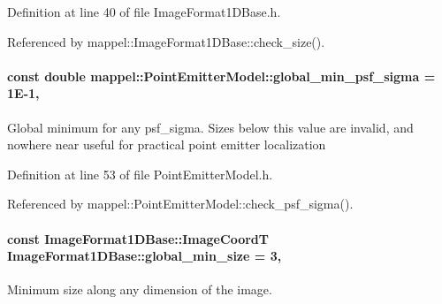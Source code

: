Definition at line 40 of file Image\+Format1\+D\+Base.\+h.



Referenced by mappel\+::\+Image\+Format1\+D\+Base\+::check\+\_\+size().

\paragraph[{\texorpdfstring{global\+\_\+min\+\_\+psf\+\_\+sigma}{global_min_psf_sigma}}]{\setlength{\rightskip}{0pt plus 5cm}const double mappel\+::\+Point\+Emitter\+Model\+::global\+\_\+min\+\_\+psf\+\_\+sigma = 1\+E-\/1\hspace{0.3cm}{\ttfamily [static]}, {\ttfamily [inherited]}}\hypertarget{classmappel_1_1PointEmitterModel_a77d0ca98d77cb8b94117ece2a5b182a4}{}\label{classmappel_1_1PointEmitterModel_a77d0ca98d77cb8b94117ece2a5b182a4}
Global minimum for any psf\+\_\+sigma. Sizes below this value are invalid, and nowhere near useful for practical point emitter localization 

Definition at line 53 of file Point\+Emitter\+Model.\+h.



Referenced by mappel\+::\+Point\+Emitter\+Model\+::check\+\_\+psf\+\_\+sigma().

\paragraph[{\texorpdfstring{global\+\_\+min\+\_\+size}{global_min_size}}]{\setlength{\rightskip}{0pt plus 5cm}const {\bf Image\+Format1\+D\+Base\+::\+Image\+CoordT} Image\+Format1\+D\+Base\+::global\+\_\+min\+\_\+size = 3\hspace{0.3cm}{\ttfamily [static]}, {\ttfamily [inherited]}}\hypertarget{classmappel_1_1ImageFormat1DBase_a27c75df8b3d83856d7c2c42ee987af89}{}\label{classmappel_1_1ImageFormat1DBase_a27c75df8b3d83856d7c2c42ee987af89}
Minimum size along any dimension of the image. 

